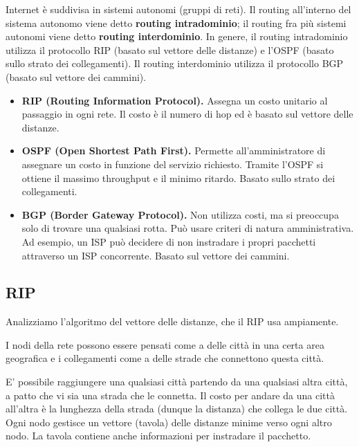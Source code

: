         \vspace{3mm}
        
        Internet è suddivisa in sistemi autonomi (gruppi di reti). Il routing all'interno del sistema autonomo viene detto \textbf{routing intradominio}; il routing fra più sistemi autonomi viene detto \textbf{routing interdominio}. In genere, il routing intradominio utilizza il protocollo RIP (basato sul vettore delle distanze) e l'OSPF (basato sullo strato dei collegamenti). Il routing interdominio utilizza il protocollo BGP (basato sul vettore dei cammini).
        
        \begin{itemize}
            \item 
                \textbf{RIP (Routing Information Protocol).} Assegna un costo unitario al passaggio in ogni rete. Il costo è il numero di hop ed è basato sul vettore delle distanze.
            
            \item
                \textbf{OSPF (Open Shortest Path First).} Permette all'amministratore di assegnare un costo in funzione del servizio richiesto. Tramite l'OSPF si ottiene il massimo throughput e il minimo ritardo. Basato sullo strato dei collegamenti.
                
            \item
                \textbf{BGP (Border Gateway Protocol).} Non utilizza costi, ma si preoccupa solo di trovare una qualsiasi rotta. Può usare criteri di natura amministrativa. Ad esempio, un ISP può decidere di non instradare i propri pacchetti attraverso un ISP concorrente. Basato sul vettore dei cammini.
        \end{itemize}
        
    \subsection{RIP}
        
        Analizziamo l'algoritmo del vettore delle distanze, che il RIP usa ampiamente.
        
        I nodi della rete possono essere pensati come a delle città in una certa area geografica e i collegamenti come a delle strade che connettono questa città.
        
        E' possibile raggiungere una qualsiasi città partendo da una qualsiasi altra città, a patto che vi sia una strada che le connetta. Il costo per andare da una città all'altra è la lunghezza della strada (dunque la distanza) che collega le due città. Ogni nodo gestisce un vettore (tavola) delle distanze minime verso ogni altro nodo. La tavola contiene anche informazioni per instradare il pacchetto.
        
